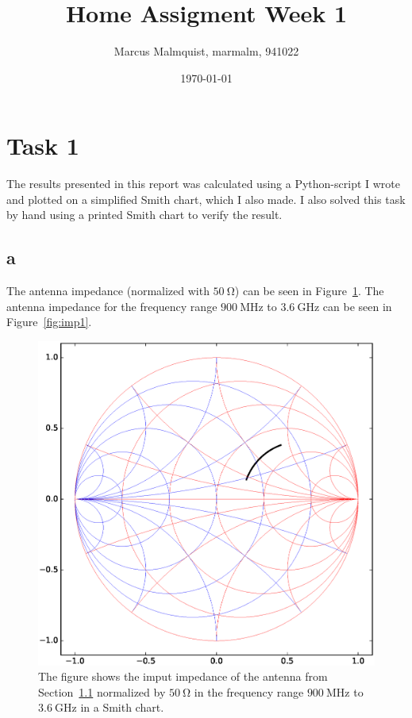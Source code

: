 \documentclass{article}
\title{Home Assigment Week 1}
\author{Marcus Malmquist, marmalm, 941022}
\date{\today}
\begin{document}
\maketitle

\section{Task 1}
The results presented in this report was calculated using a Python-script I wrote and plotted on a simplified Smith chart, which I also made. I also solved this task by hand using a printed Smith chart to verify the result.

\subsection{a}\label{sec:a}
The antenna impedance (normalized with $\SI{50}{\ohm}$) can be seen in Figure~\ref{fig:smith1}. The antenna impedance for the frequency range $\SI{900}{\mega\hertz}$ to $\SI{3.6}{\giga\hertz}$ can be seen in Figure~\ref{fig:imp1}.
\begin{figure}
  \centering
  \includegraphics[width=\textwidth]{SmithChart1.eps}
  \caption{The figure shows the imput impedance of the antenna from Section~\ref{sec:a} normalized by $\SI{50}{\ohm}$ in the frequency range $\SI{900}{\mega\hertz}$ to $\SI{3.6}{\giga\hertz}$ in a Smith chart.}
  \label{fig:smith1}
\end{figure}
\end{document}
